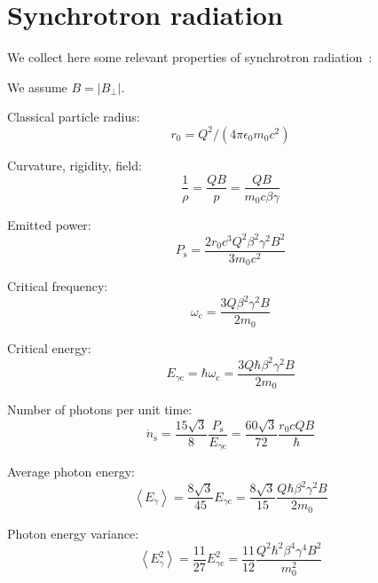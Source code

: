 \chapter{Synchrotron radiation}

We collect here some relevant properties of synchrotron radiation~\cite{hofmann_2004}:

We assume $B = |B_\perp|$.

Classical particle radius:
\begin{equation}
r_0=Q^2 /\left(4 \pi \epsilon_0 m_0 c^2\right)
\end{equation}

Curvature, rigidity, field:
\begin{equation}
\frac{1}{\rho}=\frac{Q B}{p}=\frac{Q B}{m_0 c \beta \gamma}
\end{equation}

Emitted power:
\begin{equation}
P_{\mathrm{s}}=\frac{2 r_0 c^3 Q^2 \beta^2 \gamma^2 B^2}{3 m_0 c^2}
\end{equation}



Critical frequency:
\begin{equation}
\omega_{\mathrm{c}}=\frac{3 Q \beta^2 \gamma^2 B }{2 m_0}
\end{equation}

Critical energy:
\begin{equation}
E_{\gamma \mathrm{c}}=\hbar \omega_{\mathrm{c}}
=\frac{3 Q \hbar\beta^2 \gamma^2 B }{2 m_0}
\end{equation}

Number of photons per unit time:
\begin{equation}
\dot{n}_{\mathrm{s}}=\frac{15 \sqrt{3}}{8}\frac{P_{\mathrm{s}}}{E_{\gamma \mathrm{c}}}
=\frac{60 \sqrt{3}}{72}
\frac{ r_0 c Q B}{\hbar}
\end{equation}

Average photon energy:
\begin{equation}
\left\langle E_\gamma\right\rangle=\frac{8 \sqrt{3}}{45} E_{\gamma \mathrm{c}}
=\frac{8 \sqrt{3}}{15}
\frac{ Q \hbar\beta^2 \gamma^2 B }{2 m_0}
\end{equation}

Photon energy variance:
\begin{equation}
\left\langle E_\gamma^2\right\rangle=\frac{11}{27} E_{\gamma \mathrm{c}}^2
=
\frac{11}{12}\frac{ Q^2\hbar^2\beta^4\gamma^4 B^2 }{ m_0^2}
\end{equation}

